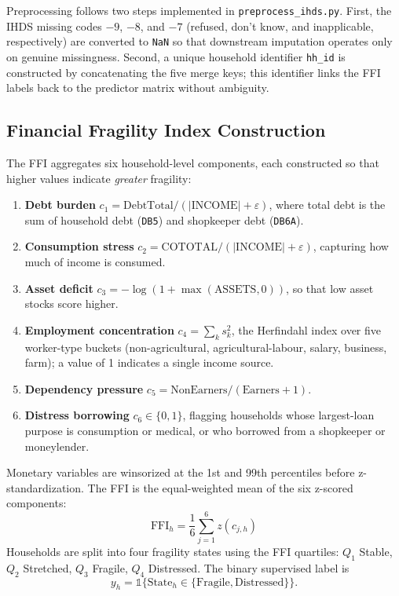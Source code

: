 \documentclass[colorlinks,balance]{asmeconf}
\begin{document}
Preprocessing follows two steps implemented in \texttt{preprocess\_ihds.py}. First, the IHDS missing codes $-9$, $-8$, and $-7$ (refused, don't know, and inapplicable, respectively) are converted to \texttt{NaN} so that downstream imputation operates only on genuine missingness. Second, a unique household identifier \texttt{hh\_id} is constructed by concatenating the five merge keys; this identifier links the FFI labels back to the predictor matrix without ambiguity.

\subsection{Financial Fragility Index Construction}
The FFI aggregates six household-level components, each constructed so that higher values indicate \emph{greater} fragility:
\begin{enumerate}
\item \textbf{Debt burden} $c_1 = \text{DebtTotal} / (|\text{INCOME}| + \varepsilon)$, where total debt is the sum of household debt (\texttt{DB5}) and shopkeeper debt (\texttt{DB6A}).
\item \textbf{Consumption stress} $c_2 = \text{COTOTAL} / (|\text{INCOME}| + \varepsilon)$, capturing how much of income is consumed.
\item \textbf{Asset deficit} $c_3 = -\log(1 + \max(\text{ASSETS}, 0))$, so that low asset stocks score higher.
\item \textbf{Employment concentration} $c_4 = \sum_{k} s_k^2$, the Herfindahl index over five worker-type buckets (non-agricultural, agricultural-labour, salary, business, farm); a value of 1 indicates a single income source.
\item \textbf{Dependency pressure} $c_5 = \text{NonEarners} / (\text{Earners} + 1)$.
\item \textbf{Distress borrowing} $c_6 \in \{0, 1\}$, flagging households whose largest-loan purpose is consumption or medical, or who borrowed from a shopkeeper or moneylender.
\end{enumerate}

Monetary variables are winsorized at the 1st and 99th percentiles before z-standardization. The FFI is the equal-weighted mean of the six z-scored components:
\begin{equation}\label{eq:ffi}
\text{FFI}_h = \frac{1}{6}\sum_{j=1}^{6} z\!\left(c_{j,h}\right)
\end{equation}
Households are split into four fragility states using the FFI quartiles: $Q_1$ Stable, $Q_2$ Stretched, $Q_3$ Fragile, $Q_4$ Distressed. The binary supervised label is
\begin{equation}\label{eq:fragbinary}
y_h = \mathbb{1}\{\text{State}_h \in \{\text{Fragile}, \text{Distressed}\}\}.
\end{equation}
\end{document}
